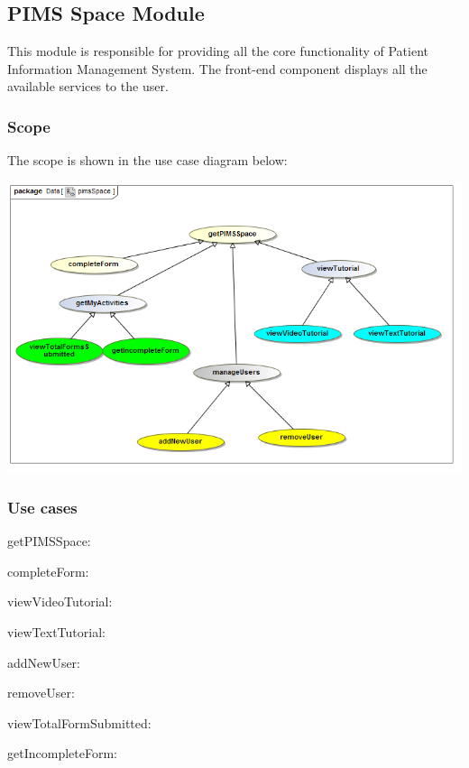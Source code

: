 \subsection{PIMS Space Module}
This module is responsible for providing all the core functionality of Patient Information Management System. The front-end component displays all the available services to the user. \par 

\subsubsection{Scope}
The scope is shown in the use case diagram below: \par
\includegraphics[width=0.75\linewidth]{./Graphics/pimsSpace/pimsSpace}

\subsubsection{Use cases}
\begin{description}
	\item{getPIMSSpace:} 
	\item{completeForm:}
	\item{viewVideoTutorial:}
	\item{viewTextTutorial:}
	\item{addNewUser:}
	\item{removeUser:}
	\item{viewTotalFormSubmitted:}
	\item{getIncompleteForm:}
\end{description}
